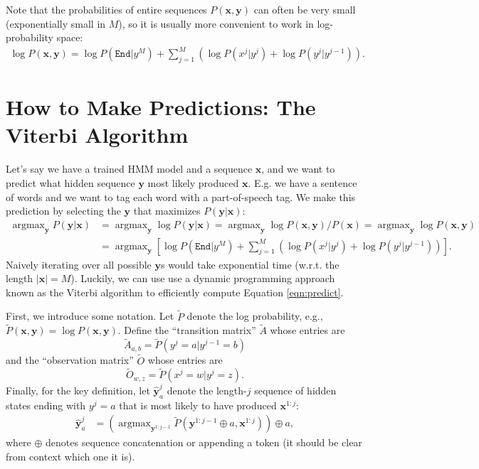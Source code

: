 \documentclass{article}
\DeclareMathOperator{\argmax}{argmax}
\newcommand{\Yh}{\hat{\textbf{y}}}
\newcommand{\Pt}{\tilde{P}}
\newcommand{\At}{\tilde{A}}
\newcommand{\Ot}{\tilde{O}}
\newcommand{\x}{\textbf{x}}
\newcommand{\y}{\textbf{y}}
\newcommand{\END}{\texttt{End}}
\begin{document}
Note that the probabilities of entire sequences $P(\x,\y)$ can often be very small (exponentially small in $M$), so it is usually more convenient to work in log-probability space:
\begin{eqnarray}\log P(\x,\y) = \log P(\END|y^M)+\sum_{j=1}^M\left(\log P(x^j|y^j) + \log P(y^j|y^{j-1})\right).\label{eqn:log_hmm}\end{eqnarray}


\section{How to Make Predictions: The Viterbi Algorithm}

Let's say we have a trained HMM model and a sequence $\x$, and we want to predict what hidden sequence $\y$ most likely produced $\x$.  E.g. we have a sentence of words and we want to tag each word with a part-of-speech tag.  We make this prediction by selecting the $\y$ that maximizes $P(\y|\x)$:
\begin{align}\argmax_{\y} P(\y|\x)& = \argmax_\y \log P(\y|\x) =\argmax_\y \log P(\x,\y)/P(\x) =\argmax_\y \log P(\x,\y) \nonumber\\
      &= \argmax_\y \left[\log P(\END|y^M) + \sum_{j=1}^M \left( \log P(x^j|y^j) + \log P(y^j|y^{j-1})\right)\right].\label{eqn:predict}\end{align}
Naively iterating over all possible $\y$s would take exponential time (w.r.t. the length $|\x|=M$).  Luckily, we can use use a dynamic programming approach known as the Viterbi algorithm to efficiently compute Equation \ref{eqn:predict}.

First, we introduce some notation. Let $\Pt$ denote the log probability, e.g., $\Pt(\x,\y) = \log P(\x,\y)$. Define the ``transition matrix'' $\At$ whose entries are \[\At_{a,b} = \Pt(y^j=a|y^{j-1}=b)\] and the ``observation matrix'' $\Ot$ whose entries are \[\Ot_{w,z} = \Pt(x^j=w|y^j=z).\]
Finally, for the key definition, let $\Yh^j_a$ denote the length-$j$ sequence of hidden states ending with $y^j=a$ that is most likely to have produced $\x^{1:j}$:  
\begin{align}
\Yh^j_a &= \left(\argmax_{\y^{1:j-1}} \Pt(\y^{1:j-1} \oplus a, \x^{1:j})\right) \oplus a,\label{eqn:Yh}\end{align}
where $\oplus$ denotes sequence concatenation or appending a token (it should be clear from context which one it is).
\end{document}
